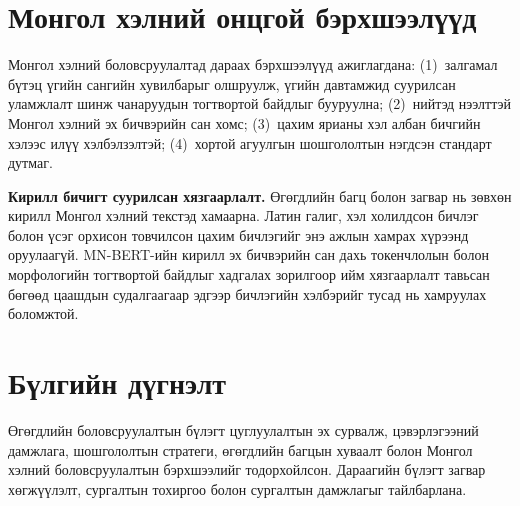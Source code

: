 \section{Монгол хэлний онцгой бэрхшээлүүд}

Монгол хэлний боловсруулалтад дараах бэрхшээлүүд ажиглагдана: (1)~залгамал
бүтэц үгийн сангийн хувилбарыг олшруулж, үгийн давтамжид суурилсан уламжлалт
шинж чанаруудын тогтвортой байдлыг бууруулна; (2)~нийтэд нээлттэй Монгол хэлний
эх бичвэрийн сан хомс; (3)~цахим ярианы хэл албан бичгийн хэлээс илүү
хэлбэлзэлтэй; (4)~хортой агуулгын шошгололтын нэгдсэн стандарт дутмаг.

\textbf{Кирилл бичигт суурилсан хязгаарлалт.} Өгөгдлийн багц болон загвар нь зөвхөн
кирилл Монгол хэлний текстэд хамаарна. Латин галиг, хэл холилдсон бичлэг болон
үсэг орхисон товчилсон цахим бичлэгийг энэ ажлын хамрах хүрээнд оруулаагүй.
MN-BERT-ийн кирилл эх бичвэрийн сан дахь токенчлолын болон морфологийн
тогтвортой байдлыг хадгалах зорилгоор ийм хязгаарлалт тавьсан бөгөөд цаашдын
судалгаагаар эдгээр бичлэгийн хэлбэрийг тусад нь хамруулах боломжтой.


\section{Бүлгийн дүгнэлт}

Өгөгдлийн боловсруулалтын бүлэгт цуглуулалтын эх сурвалж, цэвэрлэгээний
дамжлага, шошгололтын стратеги, өгөгдлийн багцын хуваалт болон Монгол хэлний
боловсруулалтын бэрхшээлийг тодорхойлсон. Дараагийн бүлэгт загвар хөгжүүлэлт,
сургалтын тохиргоо болон сургалтын дамжлагыг тайлбарлана.
